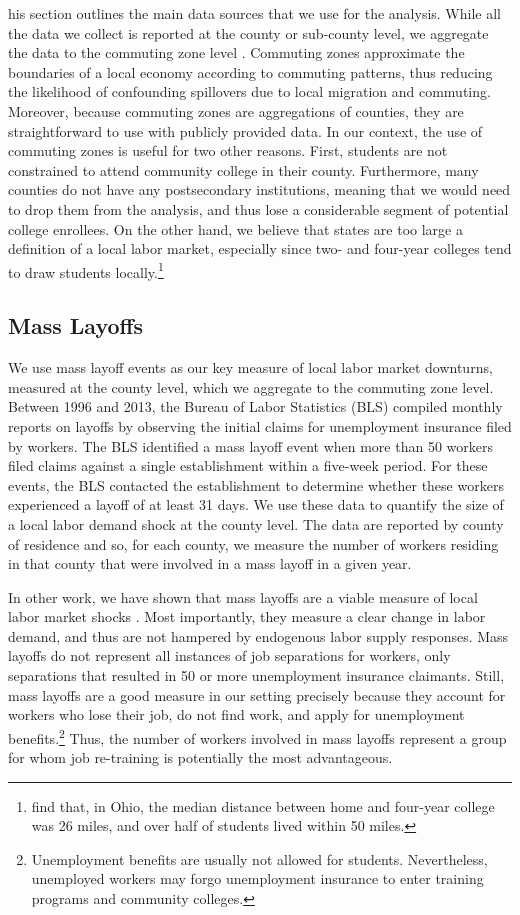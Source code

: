 his section outlines the main data sources that we use for the analysis. While all the data we collect is reported at the county or sub-county level, we aggregate the data to the commuting zone level \citep{TS1996}. Commuting zones 
approximate the boundaries of a local economy according to commuting patterns, thus reducing the likelihood of confounding spillovers due to local migration and commuting. Moreover, because commuting zones are aggregations of counties, they are straightforward to use with publicly provided data. In our context, the use of commuting zones is useful for two other reasons. First, students are not constrained to attend community college in their county. Furthermore, many counties do not have any postsecondary institutions, meaning that we would need to drop them from the analysis, and thus lose a considerable segment of potential college enrollees. On the other hand, we believe that states are too large a definition of a local labor market, especially since two- and four-year colleges tend to draw students locally.\footnote{\citet{BL2009} find that, in Ohio, the median distance between home and four-year college was 26 miles, and over half of students lived within 50 miles.} 

\subsection{Mass Layoffs}
We use mass layoff events as our key measure of local labor market downturns, measured at the county level, which we aggregate to the commuting zone level. Between 1996 and 2013, the Bureau of Labor Statistics (BLS) compiled monthly reports on layoffs by observing the initial claims for unemployment insurance filed by workers. The BLS identified a mass layoff event when more than 50 workers filed claims against a single establishment within a five-week period. For these events, the BLS contacted the establishment to determine whether these workers experienced a layoff of at least 31 days. We use these data to quantify the size of a local labor demand shock at the county level. The data are reported by county of residence and so, for each county, we measure the number of workers residing in that county that were involved in a mass layoff in a given year. 

In other work, we have shown that mass layoffs are a viable measure of local labor market shocks \citep{FGS2015}. Most importantly, they measure a clear change in labor demand, and thus are not hampered by endogenous labor supply responses. Mass layoffs do not represent all instances of job separations for workers, only separations that resulted in 50 or more unemployment insurance claimants. Still, mass layoffs are a good measure in our setting precisely because they account for workers who lose their job, do not find work, and apply for unemployment benefits.\footnote{Unemployment benefits are usually not allowed for students. Nevertheless, unemployed workers may forgo unemployment insurance to enter training programs and community colleges.}  Thus, the number of workers involved in mass layoffs represent a group for whom job re-training is potentially the most advantageous.

